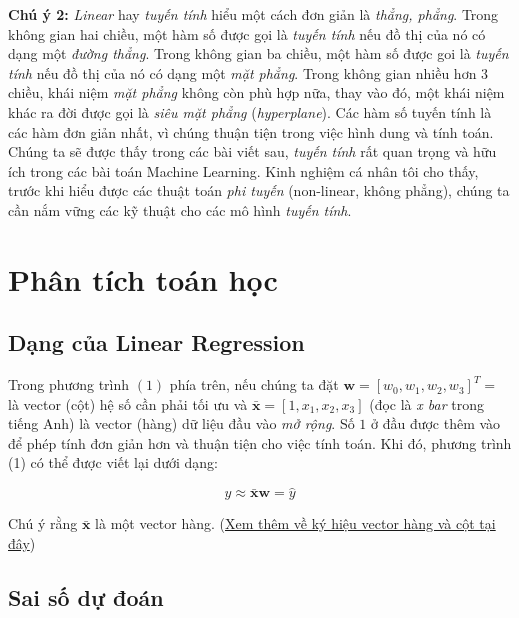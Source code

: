 \textbf{Chú ý 2:} \textit{Linear} hay \textit{tuyến tính} hiểu một cách đơn giản là \textit{thẳng, phẳng}. Trong không gian hai chiều, một hàm số được gọi là \textit{tuyến tính} nếu đồ thị của nó có dạng một \textit{đường thẳng}. Trong không gian ba chiều, một hàm số được goi là \textit{tuyến tính} nếu đồ thị của nó có dạng một \textit{mặt phẳng}. Trong không gian nhiều hơn 3 chiều, khái niệm \textit{mặt phẳng} không còn phù hợp nữa, thay vào đó, một khái niệm khác ra đời được gọi là \textit{siêu mặt phẳng} (\textit{hyperplane}). Các hàm số tuyến tính là các hàm đơn giản nhất, vì chúng thuận tiện trong việc hình dung và tính toán. Chúng ta sẽ được thấy trong các bài viết sau, \textit{tuyến tính} rất quan trọng và hữu ích trong các bài toán Machine Learning. Kinh nghiệm cá nhân tôi cho thấy, trước khi hiểu được các thuật toán \textit{phi tuyến} (non-linear, không phẳng), chúng ta cần nắm vững các kỹ thuật cho các mô hình \textit{tuyến tính}. 
 
 
 
 
 
\section{Phân tích toán học}
 
 
 
 
\subsection{Dạng của Linear Regression }
 
Trong phương trình $(1)$ phía trên, nếu chúng ta đặt $\mathbf{w} = [w_0, w_1, w_2, w_3]^T = $ là vector (cột) hệ số cần phải tối ưu và $\mathbf{\bar{x}} = [1, x_1, x_2, x_3]$ (đọc là \textit{x bar} trong tiếng Anh) là vector (hàng) dữ liệu đầu vào \textit{mở rộng}. Số $1$ ở đầu được thêm vào để phép tính đơn giản hơn và thuận tiện cho việc tính toán. Khi đó, phương trình (1) có thể được viết lại dưới dạng: 
 
$$y \approx \mathbf{\bar{x}}\mathbf{w} = \hat{y}$$ 
 
Chú ý rằng $\mathbf{\bar{x}}$ là một vector hàng. (\href{/math/#luu-y-ve-ky-hieu}{Xem thêm về ký hiệu vector hàng và cột tại đây}) 
 
 
 
\subsection{Sai số dự đoán }
 
